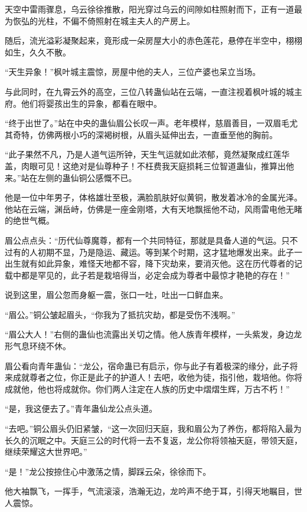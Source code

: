 \begin{this_body}
天空中雷雨骤息，乌云徐徐推散，阳光穿过乌云的间隙如柱照射而下，正有一道最为恢弘的光柱，不偏不倚照射在城主夫人的产房上。

随后，流光溢彩凝聚起来，竟形成一朵房屋大小的赤色莲花，悬停在半空中，栩栩如生，久久不散。

“天生异象！”枫叶城主震惊，房屋中他的夫人，三位产婆也呆立当场。

与此同时，在九霄云外的高空，三位八转蛊仙站在云端，一直注视着枫叶城的城主府。他们将婴孩出生的异象，都看在眼中。

“终于出世了。”站在中央的蛊仙眉公长叹一声。老年模样，慈眉善目，一双眉毛尤其奇特，仿佛两根小巧的深褐树根，从眉头延伸出去，一直垂至他的胸前。

“此子果然不凡，乃是人道气运所钟，天生气运就如此浓郁，竟然凝聚成红莲华盖，肉眼可见！这绝对是仙尊种子！不枉费我天庭损耗三位智道蛊仙，推算出他来。”站在左侧的蛊仙铜公感慨不已。

他是一位中年男子，体格雄壮至极，满脸肌肤好似黄铜，散发着冰冷的金属光泽。他站在云端，渊岳峙，仿佛是一座金刚塔，大有天地飘摇他不动，风雨雷电他无睹的绝世气概。

眉公点点头：“历代仙尊魔尊，都有一个共同特征，那就是具备人道的气运。只不过有的人初期不显，乃是隐运、藏运。等到某个时期，这才猛地爆发出来。此子一出生就有如此异象，难怪天地都不容，降下灾劫来，要消灭他。这在历代尊者的记载中都是罕见的，此子若是栽培得当，必定会成为尊者中最惊才艳艳的存在！”

说到这里，眉公忽而身躯一震，张口一吐，吐出一口鲜血来。

“眉公。”铜公皱起眉头，“你我为了抵抗灾劫，都是受伤不浅啊。”

“眉公大人！”右侧的蛊仙也流露出关切之情。他人族青年模样，一头紫发，身边龙形气息环绕不休。

眉公看向青年蛊仙：“龙公，宿命蛊已有启示，你与此子有着极深的缘分，此子将来成就尊者之位，你正是此子的护道人！去吧，收他为徒，指引他，栽培他。你将成就他，他也将成就你。你们两人注定在人族的历史中熠熠生辉，万古不朽！”

“是，我这便去了。”青年蛊仙龙公点头道。

“去吧。”铜公眉头仍旧紧皱，“这一次回归天庭，我和眉公为了养伤，都将陷入最为长久的沉眠之中。天庭三公的时代将一去不复返，龙公你将领袖天庭，带领天庭，继续荣耀这大世界吧。”

“是！”龙公按捺住心中激荡之情，脚踩云朵，徐徐而下。

他大袖飘飞，一挥手，气流滚滚，浩瀚无边，龙吟声不绝于耳，引得天地瞩目，世人震惊。


\end{this_body}
